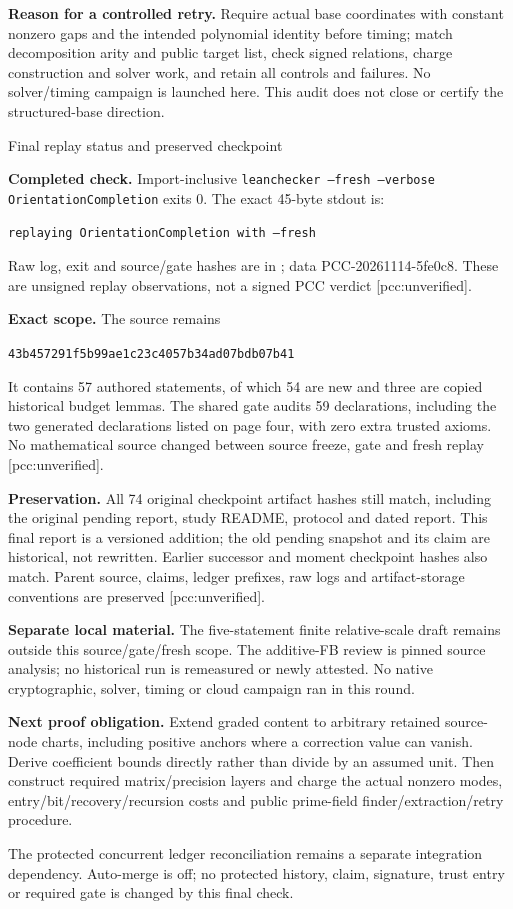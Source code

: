\documentclass[10pt]{article}
\begin{document}
\textbf{Reason for a controlled retry.} Require actual base coordinates
with constant nonzero gaps and the intended polynomial identity before
timing; match decomposition arity and public target list, check signed
relations, charge construction and solver work, and retain all controls and
failures. No solver/timing campaign is launched here. This audit does not
close or certify the structured-base direction.

\newpage
\begin{center}{\Large Final replay status and preserved checkpoint}\end{center}
\textbf{Completed check.} Import-inclusive
\texttt{leanchecker --fresh --verbose OrientationCompletion} exits 0.
The exact 45-byte stdout is:
\begin{center}\texttt{replaying OrientationCompletion with --fresh}\end{center}
Raw log, exit and source/gate hashes are in
; data PCC-20261114-5fe0c8.
These are unsigned replay observations, not a signed PCC verdict
[pcc:unverified].

\textbf{Exact scope.} The source remains
\begin{center}\small\texttt{43b457291f5b99ae1c23c4057b34ad07bdb07b41}\end{center}
It contains 57 authored statements, of which 54 are new and three are copied
historical budget lemmas. The shared gate audits 59 declarations, including
the two generated declarations listed on page four, with zero extra trusted
axioms. No mathematical source changed between source freeze, gate and fresh
replay [pcc:unverified].

\textbf{Preservation.} All 74 original checkpoint artifact hashes still
match, including the original pending report, study README, protocol and
dated report. This final report is a versioned addition; the old pending
snapshot and its claim are historical, not rewritten. Earlier successor and
moment checkpoint hashes also match. Parent source, claims, ledger prefixes,
raw logs and artifact-storage conventions are preserved [pcc:unverified].

\textbf{Separate local material.} The five-statement finite relative-scale
draft remains outside this source/gate/fresh scope. The additive-FB review
is pinned source analysis; no historical run is remeasured or newly attested.
No native cryptographic, solver, timing or cloud campaign ran in this round.

\textbf{Next proof obligation.} Extend graded content to arbitrary retained
source-node charts, including positive anchors where a correction value can
vanish. Derive coefficient bounds directly rather than divide by an assumed
unit. Then construct required matrix/precision layers and charge the actual
nonzero modes, entry/bit/recovery/recursion costs and public prime-field
finder/extraction/retry procedure.

The protected concurrent ledger reconciliation remains a separate integration
dependency. Auto-merge is off; no protected history, claim, signature, trust
entry or required gate is changed by this final check.
\end{document}
